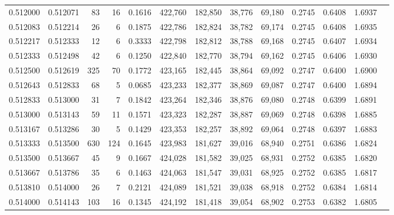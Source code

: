 \begin{tabular}{rrrrrrrrrrrrr}
0.512000 & 0.512071 &    83 &  16 &                                     0.1616 & 422,760 & 182,850 &  38,776 &  69,180 & 0.2745 & 0.6408 & 1.6937 \\
0.512083 & 0.512214 &    26 &   6 &                                     0.1875 & 422,786 & 182,824 &  38,782 &  69,174 & 0.2745 & 0.6408 & 1.6935 \\
0.512217 & 0.512333 &    12 &   6 &                                     0.3333 & 422,798 & 182,812 &  38,788 &  69,168 & 0.2745 & 0.6407 & 1.6934 \\
0.512333 & 0.512498 &    42 &   6 &                                     0.1250 & 422,840 & 182,770 &  38,794 &  69,162 & 0.2745 & 0.6406 & 1.6930 \\
0.512500 & 0.512619 &   325 &  70 &                                     0.1772 & 423,165 & 182,445 &  38,864 &  69,092 & 0.2747 & 0.6400 & 1.6900 \\
0.512643 & 0.512833 &    68 &   5 &                                     0.0685 & 423,233 & 182,377 &  38,869 &  69,087 & 0.2747 & 0.6400 & 1.6894 \\
0.512833 & 0.513000 &    31 &   7 &                                     0.1842 & 423,264 & 182,346 &  38,876 &  69,080 & 0.2748 & 0.6399 & 1.6891 \\
0.513000 & 0.513143 &    59 &  11 &                                     0.1571 & 423,323 & 182,287 &  38,887 &  69,069 & 0.2748 & 0.6398 & 1.6885 \\
0.513167 & 0.513286 &    30 &   5 &                                     0.1429 & 423,353 & 182,257 &  38,892 &  69,064 & 0.2748 & 0.6397 & 1.6883 \\
0.513333 & 0.513500 &   630 & 124 &                                     0.1645 & 423,983 & 181,627 &  39,016 &  68,940 & 0.2751 & 0.6386 & 1.6824 \\
0.513500 & 0.513667 &    45 &   9 &                                     0.1667 & 424,028 & 181,582 &  39,025 &  68,931 & 0.2752 & 0.6385 & 1.6820 \\
0.513667 & 0.513786 &    35 &   6 &                                     0.1463 & 424,063 & 181,547 &  39,031 &  68,925 & 0.2752 & 0.6385 & 1.6817 \\
0.513810 & 0.514000 &    26 &   7 &                                     0.2121 & 424,089 & 181,521 &  39,038 &  68,918 & 0.2752 & 0.6384 & 1.6814 \\
0.514000 & 0.514143 &   103 &  16 &                                     0.1345 & 424,192 & 181,418 &  39,054 &  68,902 & 0.2753 & 0.6382 & 1.6805 \\

\end{tabular}
